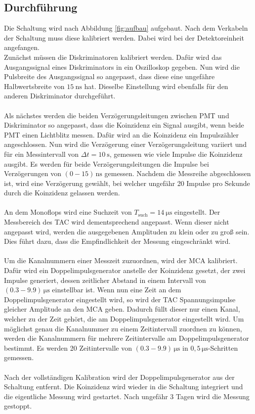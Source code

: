 \subsection{Durchführung}
Die Schaltung wird nach Abbildung \ref{fig:aufbau} aufgebaut.
Nach dem Verkabeln der Schaltung muss diese kalibriert werden.
Dabei wird bei der Detektoreinheit angefangen.\\
Zunächst müssen die Diskriminatoren kalibriert werden.
Dafür wird das Ausgangssignal eines Diskriminators in ein Oszilloskop gegeben.
Nun wird die Pulsbreite des Ausgangssignal so angepasst, dass diese eine ungefähre Halbwertsbreite von $\SI{15}{\nano\second}$ hat.
Dieselbe Einstellung wird ebenfalls für den anderen Diskriminator durchgeführt.\\\\
Als nächstes werden die beiden Verzögerungsleitungen zwischen PMT und Diskriminator so angepasst, dass die Koinzidenz ein Signal ausgibt, wenn beide PMT einen Lichtblitz messen.
Dafür wird an die Koinzidenz ein Impulszähler angeschlossen.
Nun wird die Verzögerung einer Verzögerungsleitung variiert und für ein Messintervall von $\Delta t = \SI{10}{\second}$, gemessen wie viele Impulse die Koinzidenz ausgibt.
Es werden für beide Verzögerungsleitungen die Impulse bei Verzögerungen von $(0-15)\,\si{\nano\second}$ gemessen.
Nachdem die Messreihe abgeschlossen ist, wird eine Verzögerung gewählt, bei welcher ungefähr 20 Impulse pro Sekunde durch die Koinzidenz gelassen werden.\\\\
An dem Monoflops wird eine Suchzeit von $T_\text{such} = \SI{14}{\micro\second}$ eingestellt.
Der Messbereich des TAC wird dementsprechend angepasst.
Wenn dieser nicht angepasst wird, werden die ausgegebenen Amplituden zu klein oder zu groß sein.
Dies führt dazu, dass die Empfindlichkeit der Messung eingeschränkt wird.\\\\
Um die Kanalnummern einer Messzeit zuzuordnen, wird der MCA kalibriert.
Dafür wird ein Doppelimpulsgenerator anstelle der Koinzidenz gesetzt, der zwei Impulse generiert, dessen zeitlicher Abstand in einem Intervall von $(0.3-9.9)\,\si{\micro\second}$ einstellbar ist.
Wenn nun eine Zeit an dem Doppelimpulsgenerator eingestellt wird, so wird der TAC Spannungsimpulse gleicher Amplitude an den MCA geben.
Dadurch füllt dieser nur einen Kanal, welcher zu der Zeit gehört, die am Doppelimpulsgenerator eingestellt wird.
Um möglichst genau die Kanalnummer zu einem Zeitintervall zuordnen zu können, werden die Kanalnummern für mehrere Zeitintervalle am Doppelimpulsgenerator bestimmt.
Es werden 20 Zeitintervalle von $(0.3-9.9)\,\si{\micro\second}$ in $0,5\,\si{\micro\second}$-Schritten gemessen.\\\\
Nach der vollständigen Kalibration wird der Doppelimpulsgenerator aus der Schaltung entfernt.
Die Koinzidenz wird wieder in die Schaltung integriert und die eigentliche Messung wird gestartet.
Nach ungefähr 3 Tagen wird die Messung gestoppt.